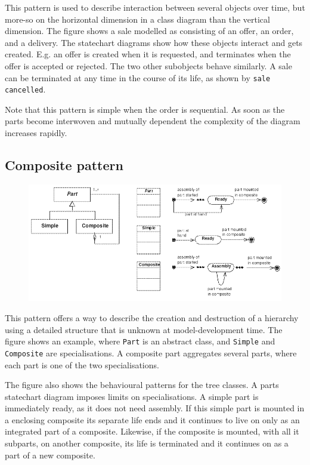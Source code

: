 This pattern is used to describe interaction between several objects over time, but more-so on the horizontal dimension in a class diagram than the vertical dimension.
The figure shows a sale modelled as consisting of an offer, an order, and a delivery. The statechart diagrams show how these objects interact and gets created. E.g. an offer is created when it is requested, and terminates when the offer is accepted or rejected. The two other subobjects behave similarly.
A sale can be terminated at any time in the course of its life, as shown by \texttt{sale cancelled}.

Note that this pattern is simple when the order is sequential. As soon as the parts become interwoven and mutually dependent the complexity of the diagram increases rapidly.
\subsection{Composite pattern}
\begin{figure}[H]
    \centering
    \includegraphics[width=.8\textwidth]{figures/compositepattern.png}
\end{figure}

This pattern offers a way to describe the creation and destruction of a hierarchy using a detailed structure that is unknown at model-development time. 
The figure shows an example, where \texttt{Part} is an abstract class, and \texttt{Simple} and \texttt{Composite} are specialisations. A composite part aggregates several parts, where each part is one of the two specialisations.

The figure also shows the behavioural patterns for the tree classes. A parts statechart diagram imposes limits on specialisations. A simple part is immediately ready, as it does not need assembly. If this simple part is mounted in a enclosing composite its separate life ends and it continues to live on only as an integrated part of a composite. Likewise, if the composite is mounted, with all it subparts, on another composite, its life is terminated and it continues on as a part of a new composite.

